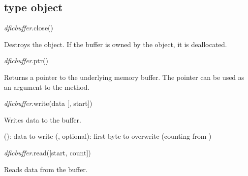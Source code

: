 \documentclass[a4paper,12pt,twoside,extrafontsizes]{memoir}
\begin{document}
\subsection{ type object}
\label{subsec:dficbuffer}


\begin{luafuncprototype}
\emph{dficbuffer}.close()
\end{luafuncprototype}

\begin{funcdescr}
	Destroys the object. If the buffer is owned by the object, it is deallocated.
\end{funcdescr}


\begin{luafuncprototype}
\emph{dficbuffer}.ptr()
\end{luafuncprototype}

\begin{funcret}
	Returns a pointer to the underlying memory buffer. The pointer can be used as an argument to the  method.
\end{funcret}


\begin{luafuncprototype}
\emph{dficbuffer}.write(data [, start])
\end{luafuncprototype}

\begin{funcdescr}
	Writes data to the buffer.
\end{funcdescr}

\begin{funcparams}
	 (): data to write
	 (, optional): first byte to overwrite (counting from )
\end{funcparams}


\begin{luafuncprototype}
\emph{dficbuffer}.read([start, count])
\end{luafuncprototype}

\begin{funcdescr}
	Reads data from the buffer.
\end{funcdescr}
\end{document}
